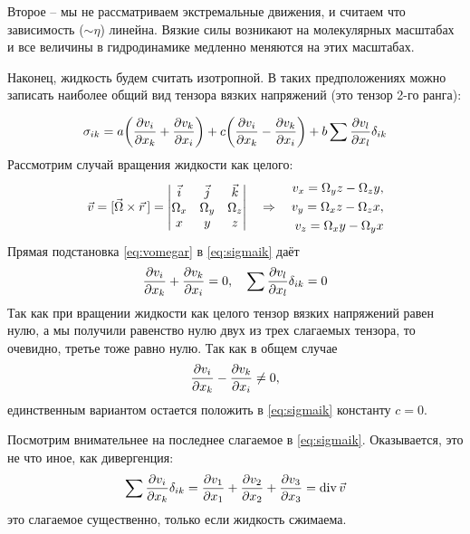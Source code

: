 Второе -- мы не рассматриваем экстремальные движения, и считаем что зависимость ($\sim \eta$) линейна. Вязкие силы возникают на молекулярных масштабах и все величины в гидродинамике медленно меняются на этих масштабах.

Наконец, жидкость будем считать изотропной. В таких предположениях можно записать наиболее общий вид тензора вязких напряжений (это тензор 2-го ранга):

\begin{equation}
	\label{eq:sigmaik}
    \sigma_{ik} = a\qty(
        \pdv{v_i}{x_k}+\pdv{v_k}{x_i}
    )+
    c\qty(
       \pdv{v_i}{x_k}-\pdv{v_k}{x_i}
    )+
    b\sum \pdv{v_l}{x_l} \delta_{ik}
\end{equation}
Рассмотрим случай вращения жидкости как целого:
\begin{equation}
	\label{eq:vomegar}
    \vec{v} = [\vec{\Omega}\times \vec{r}\,]  =
    \mqty|
    \vec{i} & \vec{j} & \vec{k}\\
    \Omega_x & \Omega_y & \Omega_z\\
    x& y & z
    | \quad \Rightarrow \quad
    \begin{aligned}
    	v_x = \Omega_y z - \Omega_z y,\\
    	v_y = \Omega_x z - \Omega_z x, \\
    	v_z = \Omega_x y - \Omega_y x
    \end{aligned}
\end{equation}
Прямая подстановка \eqref{eq:vomegar} в \eqref{eq:sigmaik} даёт
\begin{equation}
    \pdv{v_i}{x_k}+\pdv{v_k}{x_i} = 0, \quad
    \sum \pdv{v_l}{x_l} \delta_{ik} = 0
\end{equation}
Так как при вращении жидкости как 	целого тензор вязких напряжений равен нулю, а мы получили равенство нулю двух из трех слагаемых тензора, то очевидно, третье тоже равно нулю.
Так как в общем случае
\begin{equation}
    \pdv{v_i}{x_k}-\pdv{v_k}{x_i} \ne 0,
\end{equation}
единственным вариантом остается положить в \eqref{eq:sigmaik} константу $c=0$.

Посмотрим внимательнее на последнее слагаемое в \eqref{eq:sigmaik}. Оказывается, это не что иное, как дивергенция:
\begin{equation}
    \sum \pdv{v_i}{x_k} \delta_{ik} = 
    \pdv{v_1}{x_1}+\pdv{v_2}{x_2}+\pdv{v_3}{x_3} = \operatorname{div} \vec{v}
\end{equation}
это слагаемое существенно, только если жидкость сжимаема.

